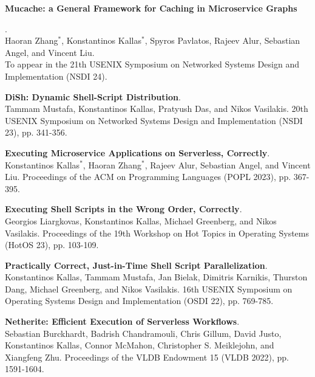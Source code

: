 \begin{minipage}{\textwidth}
\hypertarget{sec:publications}{\textbf{Mucache: a General Framework for Caching in Microservice Graphs}}. \\
Haoran Zhang$^*$, Konstantinos Kallas$^*$, Spyros Pavlatos, Rajeev Alur, Sebastian Angel, and Vincent Liu. \\
To appear in the 21th USENIX Symposium on Networked Systems Design and Implementation (NSDI 24). \\
\end{minipage}

\begin{minipage}{\textwidth}
\textbf{DiSh: Dynamic Shell-Script Distribution}. \\
Tammam Mustafa, Konstantinos Kallas, Pratyush Das, and Nikos Vasilakis.
20th USENIX Symposium on Networked Systems Design and Implementation (NSDI 23), pp. 341-356. \\
\end{minipage}

\begin{minipage}{\textwidth}
\textbf{Executing Microservice Applications on Serverless, Correctly}. \\
Konstantinos Kallas$^*$, Haoran Zhang$^*$, Rajeev Alur, Sebastian Angel, and Vincent Liu.
Proceedings of the ACM on Programming Languages (POPL 2023), pp. 367-395. \\
\end{minipage}

\begin{minipage}{\textwidth}
\textbf{Executing Shell Scripts in the Wrong Order, Correctly}. \\
Georgios Liargkovas, Konstantinos Kallas, Michael Greenberg, and Nikos Vasilakis.
Proceedings of the 19th Workshop on Hot Topics in Operating Systems (HotOS 23), pp. 103-109. \\
\end{minipage}

\begin{minipage}{\textwidth}
\textbf{Practically Correct, Just-in-Time Shell Script Parallelization}. \\
Konstantinos Kallas, Tammam Mustafa, Jan Bielak, Dimitris Karnikis, Thurston Dang, Michael Greenberg, and Nikos Vasilakis.
16th USENIX Symposium on Operating Systems Design and Implementation (OSDI 22), pp. 769-785. \\
\end{minipage}

\begin{minipage}{\textwidth}
\textbf{Netherite: Efficient Execution of Serverless Workflows}. \\
Sebastian Burckhardt, Badrish Chandramouli, Chris Gillum, David Justo, Konstantinos Kallas, Connor McMahon, Christopher S. Meiklejohn, and Xiangfeng Zhu.
Proceedings of the VLDB Endowment 15 (VLDB 2022), pp. 1591-1604. \\
\end{minipage}

